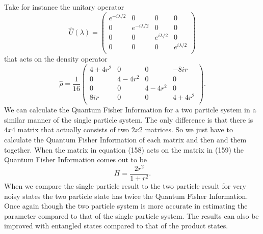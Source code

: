 \documentclass[twocolumn]{article}
\begin{document}
Take for instance the unitary operator
\begin{equation}
\hat{U}(\lambda)=
\left(\begin{array}{cccc}
e^{-i\lambda/2} & 0 & 0 & 0 \\
0 & e^{-i\lambda/2} & 0 & 0 \\
0 & 0 & e^{i\lambda/2} & 0 \\
0 & 0 & 0 & e^{i\lambda/2} \\
\end{array}\right)
\end{equation}
that acts on the density operator
\begin{equation}
\hat{\rho}=\frac{1}{16}
\left(\begin{array}{cccc}
4+4r^2 & 0 & 0 & -8ir \\
0 & 4-4r^2 & 0 & 0 \\
0 & 0 & 4-4r^2 & 0 \\
8ir & 0 & 0 & 4+4r^2 \\
\end{array}\right).
\end{equation}
We can calculate the Quantum Fisher Information for a two particle system in a similar manner of the single particle system. The only difference is that there is $4x4$ matrix that actually consists of two $2x2$ matrices. So we just have to calculate the Quantum Fisher Information of each matrix and then and them together. When the matrix in equation (158) acts on the matrix in (159) the Quantum Fisher Information comes out to be
\begin{equation}
H=\frac{2r^2}{1+r^2}.
\end{equation}
When we compare the single particle result to the two particle result for very noisy states the two particle state has twice the Quantum Fisher Information. Once again though the two particle system is more accurate in estimating the parameter compared to that of the single particle system. The results can also be improved with entangled states compared to that of the product states.
\end{document}
